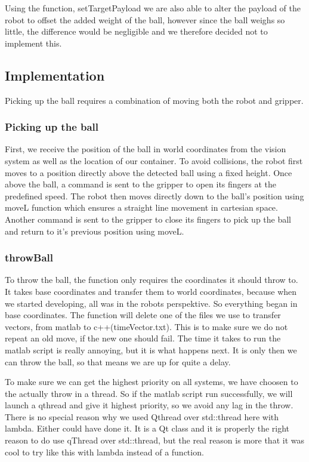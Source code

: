 Using the function, setTargetPayload we are also able to alter the payload of the robot to offset the added weight of the ball, however since the ball weighs so little, the difference would be negligible and we therefore decided not to implement this. %
\subsection{Implementation}
Picking up the ball requires a combination of moving both the robot and gripper.
\subsubsection{Picking up the ball}
First, we receive the position of the ball in world coordinates from the vision system as well as the location of our container. %
To avoid collisions, the robot first moves to a position directly above the detected ball using a fixed height.
Once above the ball, a command is sent to the gripper to open its fingers at the predefined speed.
The robot then moves directly down to the ball's position using moveL function which ensures a straight line movement in cartesian space.
Another command is sent to the gripper to close its fingers to pick up the ball and return to it's previous position using moveL.

\subsubsection{throwBall}
To throw the ball, the function only requires the coordinates it should throw to. It takes base coordinates and transfer them to world coordinates, because when we started developing, all was in the robots perspektive. So everything began in base coordinates.
The function will delete one of the files we use to transfer vectors, from matlab to c++(timeVector.txt). This is to make sure we do not repeat an old move, if the new one should fail.
The time it takes to run the matlab script is really annoying, but it is what happens next. It is only then we can throw the ball, so that means we are up for quite a delay.

To make sure we can get the highest priority on all systems, we have choosen to the actually throw in a thread. So if the matlab script run successfully, we will launch a qthread and give it highest priority, so we avoid any lag in the throw.
There is no special reason why we used Qthread over std::thread here with lambda. Either could have done it. 
It is a Qt class and it is properly the right reason to do use qThread over std::thread, but the real reason is more that it was cool to try like this with lambda instead of a function.

